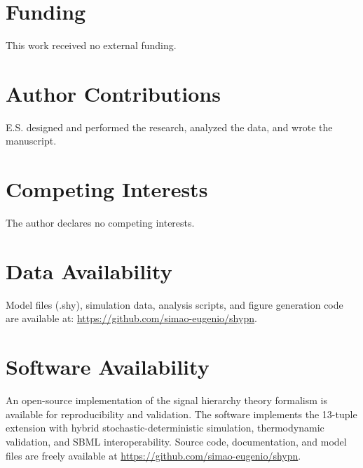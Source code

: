\documentclass[twocolumn,11pt]{article}
\begin{document}
\section*{Funding}

This work received no external funding.

\section*{Author Contributions}

E.S. designed and performed the research, analyzed the data, and wrote the manuscript.

\section*{Competing Interests}

The author declares no competing interests.

\section*{Data Availability}

Model files (.shy), simulation data, analysis scripts, and figure generation code are available at: \url{https://github.com/simao-eugenio/shypn}.

\section*{Software Availability}

An open-source implementation of the signal hierarchy theory formalism is available for reproducibility and validation. The software implements the 13-tuple extension with hybrid stochastic-deterministic simulation, thermodynamic validation, and SBML interoperability. Source code, documentation, and model files are freely available at \url{https://github.com/simao-eugenio/shypn}.



\end{document}
